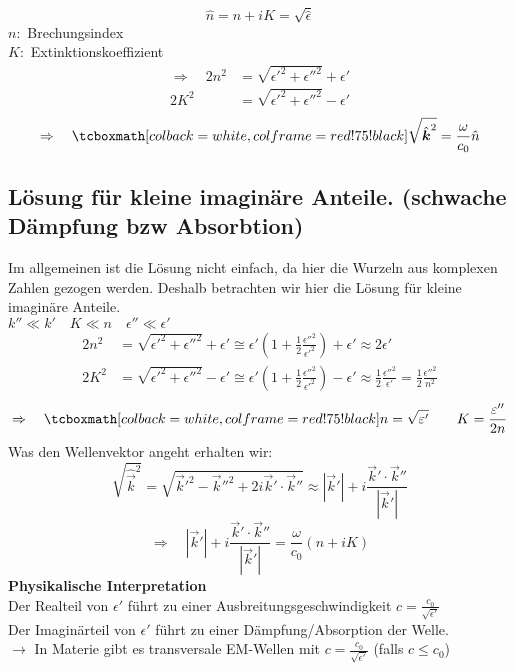 \begin{equation*}
\hat{n} = n + i K = \sqrt{\hat{\epsilon}}
\end{equation*}
$ n : $ Brechungsindex\\
$ K : $ Extinktionskoeffizient
\begin{align*}
\Rightarrow \quad 2 n^2 &= \sqrt{\epsilon'^2 + \epsilon''^2} + \epsilon'\\
2 K^2 &= \sqrt{\epsilon'^2 + \epsilon''^2} - \epsilon'
\end{align*}
\begin{equation*}
\Rightarrow \quad \rmbox{\sqrt{\hat{\vec{k}}^2 } = \frac{\omega}{c_0} \hat{n}}
\end{equation*}

\subsection{Lösung für kleine imaginäre Anteile. (schwache Dämpfung bzw Absorbtion)}

Im allgemeinen ist die Lösung nicht einfach, da hier die Wurzeln aus komplexen Zahlen gezogen werden. Deshalb betrachten wir hier die Lösung für kleine imaginäre Anteile.\\
$ k'' \ll k' \quad K \ll n \quad \epsilon'' \ll \epsilon' $
\begin{align*}
2n^2 &= \sqrt{\epsilon'^2 + \epsilon''^2} + \epsilon' \cong \epsilon' \left(1 + \frac{1}{2} \frac{\epsilon''^2}{\epsilon'^2}\right) + \epsilon' \approx 2 \epsilon' \\
2K^2 &= \sqrt{\epsilon'^2 + \epsilon''^2} - \epsilon' \cong \epsilon' \left(1 + \frac{1}{2} \frac{\epsilon''^2}{\epsilon'^2}\right) - \epsilon' \approx \frac{1}{2} \frac{\epsilon''^2}{\epsilon'} = \frac{1}{2} \frac{\epsilon''^2}{n^2}
\end{align*}
\begin{equation*}
\Rightarrow \quad \rmbox{n = \sqrt{\epsilon'} \qquad K = \frac{\epsilon''}{2n}}
\end{equation*}
Was den Wellenvektor angeht erhalten wir:
\begin{equation*}
\sqrt{\hat{\vec{k}}^2} = \sqrt{\vec{k}'^2 - \vec{k}''^2 + 2 i \vec{k}' \cdot \vec{k}''} \approx | \vec{k}' | + i \frac{\vec{k}' \cdot \vec{k}''}{|\vec{k}'|}
\end{equation*}
\begin{equation*}
\Rightarrow \quad |\vec{k}'|  + i \frac{\vec{k}' \cdot \vec{k}''}{|\vec{k}'|} = \frac{\omega}{c_0} (n + i K)
\end{equation*}
\textbf{Physikalische Interpretation}\\[5pt]
Der Realteil von $\epsilon'$ führt zu einer Ausbreitungsgeschwindigkeit $ c = \frac{c_0}{\sqrt{\epsilon'}} $\\
Der Imaginärteil von $\epsilon'$ führt zu einer Dämpfung/Absorption der Welle.\\
$\rightarrow$ In Materie gibt es transversale EM-Wellen mit $ c = \frac{c_0}{\sqrt{\epsilon'}}$ (falls $c\leq c_0$)

